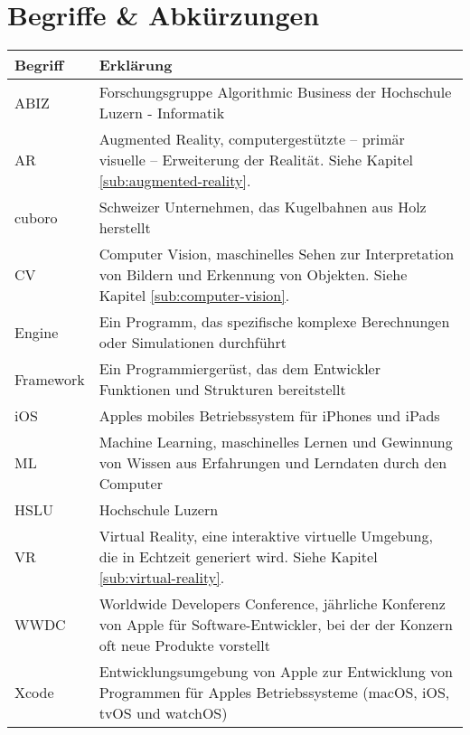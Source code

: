 \section*{Begriffe \& Abkürzungen}
\begin{table}
	\begin{tabular}{@{} p{} p{} @{}}
		\hline
		\textbf{Begriff} & \textbf{Erklärung} \\
		\hline
		ABIZ	& Forschungsgruppe Algorithmic Business der Hochschule Luzern - Informatik \\
		AR 		& Augmented Reality, computergestützte – primär visuelle – Erweiterung der Realität. Siehe Kapitel \ref{sub:augmented-reality}. \\
		cuboro	& Schweizer Unternehmen, das Kugelbahnen aus Holz herstellt \\
		CV		& Computer Vision, maschinelles Sehen zur Interpretation von Bildern und Erkennung von Objekten. Siehe Kapitel \ref{sub:computer-vision}. \\
		Engine	& Ein Programm, das spezifische komplexe Berechnungen oder Simulationen durchführt \\
		Framework	& Ein Programmiergerüst, das dem Entwickler Funktionen und Strukturen bereitstellt \\
		iOS		& Apples mobiles Betriebssystem für iPhones und iPads \\
		ML		& Machine Learning, maschinelles Lernen und Gewinnung von Wissen aus Erfahrungen und Lerndaten durch den Computer \\
		HSLU	& Hochschule Luzern \\
		VR		& Virtual Reality, eine interaktive virtuelle Umgebung, die in Echtzeit generiert wird. Siehe Kapitel \ref{sub:virtual-reality}. \\
		WWDC	& Worldwide Developers Conference, jährliche Konferenz von Apple für Software-Entwickler, bei der der Konzern oft neue Produkte vorstellt \\
		Xcode	& Entwicklungsumgebung von Apple zur Entwicklung von Programmen für Apples Betriebssysteme (macOS, iOS, tvOS und watchOS) \\
		\hline
	\end{tabular}
\end{table}
